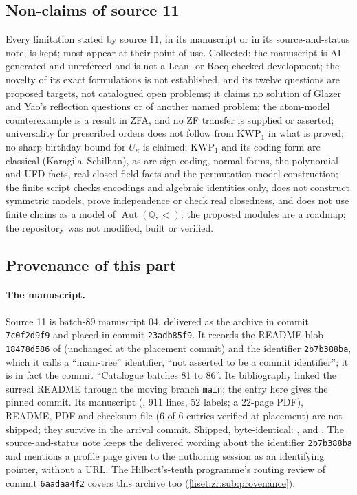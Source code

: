 \documentclass[11pt,letterpaper]{article}
\theoremstyle{definition}
\theoremstyle{remark}
\newcommand{\Aut}{\operatorname{Aut}}
\newcommand{\KWP}{\mathrm{KWP}}
\newcommand{\Q}{\mathbb Q}
\begin{document}
\subsection{Non-claims of source 11}
\label{hset:kw:sub:nonclaims}
Every limitation stated by source 11, in its manuscript or in its
source-and-status note, is kept; most appear at their point of use. Collected:
the manuscript is AI-generated and unrefereed and is not a Lean- or
Rocq-checked development; the novelty of its exact formulations is not
established, and its twelve questions are proposed targets, not catalogued
open problems; it claims no solution of Glazer and Yao's reflection questions
or of another named problem; the atom-model counterexample is a result in ZFA,
and no ZF transfer is supplied or asserted; universality for prescribed orders
does not follow from $\KWP_1$ in what is proved; no sharp birthday bound for
$U_\kappa$ is claimed; $\KWP_1$ and its coding form are classical
(Karagila--Schilhan), as are sign coding, normal forms, the polynomial and UFD
facts, real-closed-field facts and the permutation-model construction; the
finite script checks encodings and algebraic identities only, does not
construct symmetric models, prove independence or check real closedness, and
does not use finite chains as a model of $\Aut(\Q,<)$; the proposed modules are
a roadmap; the repository was not modified, built or verified.

\subsection{Provenance of this part}
\label{hset:kw:sub:provenance}

\paragraph{The manuscript.} Source 11 is batch-89 manuscript 04, delivered as
the archive  in commit
\texttt{7c0f2d9f9} and placed in commit \texttt{23adb85f9}. It records the
README blob \texttt{18478d586} of 
(unchanged at the placement commit) and the identifier \texttt{2b7b388ba},
which it calls a ``main-tree'' identifier, ``not asserted to be a commit
identifier''; it is in fact the commit ``Catalogue batches 81 to 86''. Its
bibliography linked the surreal README through the moving branch
\texttt{main}; the entry \cite{ProveItSurreal} here gives the pinned commit.
Its manuscript (, 911 lines, 52 labels; a 22-page PDF), README,
PDF and checksum file  (6 of 6 entries verified at placement)
are not shipped; they survive in the arrival commit. Shipped, byte-identical:
,
 and
. The
source-and-status note keeps the delivered wording about the identifier
\texttt{2b7b388ba} and mentions a profile page given to the authoring session
as an identifying pointer, without a URL. The Hilbert's-tenth programme's
routing review of commit \texttt{6aadaa4f2} covers this archive too
(\cref{hset:zr:sub:provenance}).
\end{document}
